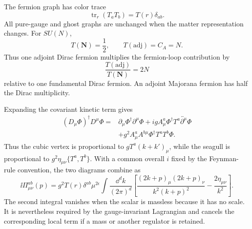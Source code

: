 \begin{enumerate}
\begin{enumerate}
\begin{center}
    \end{center}
    The fermion graph has color trace
    \[
      \operatorname{tr}_r(T_aT_b)=T(r)\delta_{ab}.
    \]
    All pure-gauge and ghost graphs are unchanged when the matter
    representation changes.  For \(SU(N)\),
    \[
      T(\boldsymbol N)=\frac12,\qquad
      T(\mathrm{adj})=C_A=N.
    \]
    Thus one adjoint Dirac fermion multiplies the fermion-loop contribution
    by
    \[
      \boxed{\frac{T(\mathrm{adj})}{T(\boldsymbol N)}=2N}
    \]
    relative to one fundamental Dirac fermion.  An adjoint Majorana fermion
    has half the Dirac multiplicity.
  \end{enumerate}
  Expanding the covariant kinetic term gives
  \[
  \begin{split}
    (D_\mu\Phi)^\dagger D^\mu\Phi
      ={}&\partial_\mu\Phi^\dagger\partial^\mu\Phi
      +igA_\mu^a\Phi^\dagger T^a
        \overleftrightarrow{\partial^\mu}\Phi\\
      &+g^2A_\mu^aA^{b\mu}\Phi^\dagger T^aT^b\Phi .
  \end{split}
  \]
  Thus the cubic vertex is proportional to
  \(gT^a(k+k')_\mu\), while the seagull is proportional to
  \(g^2\eta_{\mu\nu}\{T^a,T^b\}\).  With a common overall \(i\) fixed by
  the Feynman-rule convention, the two diagrams combine as
  \[
    \ii\Pi_{\mu\nu}^{ab}(p)=
    g^2T(r)\delta^{ab}\mu^{2\epsilon}
    \int\frac{\dd^dk}{(2\pi)^d}
    \left[
      \frac{(2k+p)_\mu(2k+p)_\nu}{k^2(k+p)^2}
      -\frac{2\eta_{\mu\nu}}{k^2}
    \right].
  \]
  The second integral vanishes when the scalar is massless because it has
  no scale.  It is nevertheless required by the gauge-invariant
  Lagrangian and cancels the corresponding local term if a mass or another
  regulator is retained.


\end{enumerate}
